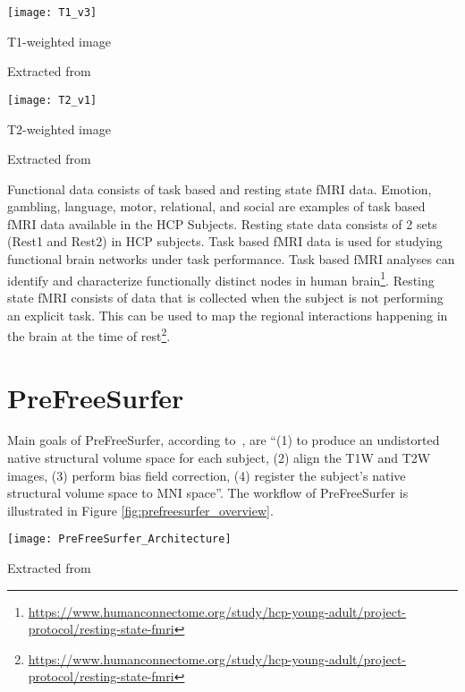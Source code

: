 \begin{center}
  \texttt{[image: T1\_v3]}
  \caption{T1-weighted image}
  \label{fig:T1w}
  \caption*{Extracted from \cite{t1w_t2w}}
\end{center}

\begin{center}
  \texttt{[image: T2\_v1]}
  \caption{T2-weighted image}
  \label{fig:T2w}
  \caption*{Extracted from \cite{t1w_t2w}}
\end{center}

\indent Functional data consists of task based and resting state fMRI 
data. Emotion, gambling, language, motor, relational, and social are 
examples of task based fMRI data available in the HCP Subjects. Resting 
state data consists of 2 sets (Rest1 and Rest2) in HCP subjects. Task 
based fMRI data is used for studying functional brain networks under 
task performance. Task based fMRI analyses can identify and 
characterize functionally distinct nodes in human 
brain\footnote{\url{https://www.humanconnectome.org/study/hcp-young-adult/project-protocol/resting-state-fmri}}. 
Resting state fMRI consists of data that is collected when the subject 
is not performing an explicit task. This can be used to map the 
regional interactions happening in the brain at the time of 
rest\footnote{\url{https://www.humanconnectome.org/study/hcp-young-adult/project-protocol/resting-state-fmri}}.


\section{PreFreeSurfer} \label{sec:PrefreeSurfer}
Main goals of PreFreeSurfer, according to~\cite{Gla13}, are ``(1) to produce an undistorted native structural volume space for each subject, (2) align the T1W and T2W images, (3) perform bias field correction, (4) register the subject's native structural volume space to MNI space''. The workflow of PreFreeSurfer is illustrated in Figure \ref{fig:prefreesurfer_overview}.

\begin{center}
  \texttt{[image: PreFreeSurfer\_Architecture]}
  \label{fig:prefreesurfer_overview}
  \caption*{Extracted from \cite{Gla13}}
\end{center}

